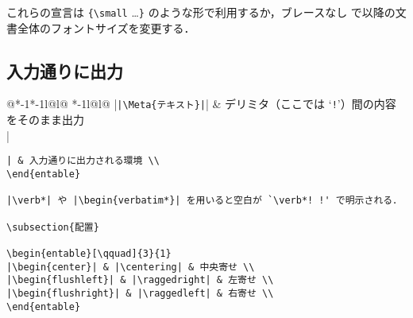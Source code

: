 \documentclass[10pt,a4paper,landscape,draft]{jarticle}
\makeatletter
\def\set@etsep#1#2{\def\etcolsep{#1}\def\etitemsep{#2}}
\newenvironment{entable}[3][\quad\qquad]{%
  \set@etsep#1\relax\relax
  \begin{tabular}{%
    @{}*{\the\numexpr#3-1}{*{\the\numexpr#2-1}{l@{\etcolsep}}l@{\etitemsep}}%
    *{\the\numexpr#2-1}{l@{\etcolsep}}l@{}}}{%
  \end{tabular}}
\newcommand{\Meta}[1]{$\langle$\mbox{}\emph{#1}\mbox{}$\rangle$}
\makeatother
\begin{document}
\egroup

これらの宣言は \verb!{\small! \ldots\verb!}! のような形で利用するか，ブレースなし
で以降の文書全体のフォントサイズを変更する．

\subsection{入力通りに出力}

\begin{entable}[\enspace]{2}{1}
|\verb!|\Meta{テキスト}|!| & デリミタ（ここでは `\texttt{!}'）間の内容をそのまま出力 \\
|\begin{verbatim}| & 入力通りに出力される環境 \\
\end{entable}

|\verb*| や |\begin{verbatim*}| を用いると空白が `\verb*! !' で明示される．

\subsection{配置}

\begin{entable}[\qquad]{3}{1}
|\begin{center}| & |\centering| & 中央寄せ \\
|\begin{flushleft}| & |\raggedright| & 左寄せ \\
|\begin{flushright}| & |\raggedleft| & 右寄せ \\
\end{entable}


\end{verbatim}
\end{entable}
\end{document}
\end{multicols}
\end{document}
